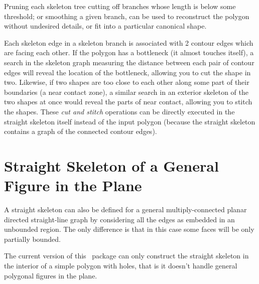 Pruning each skeleton tree cutting off branches whose length is below some threshold; or smoothing a given branch, can be used to reconstruct the polygon without undesired details, or fit into a particular canonical shape.

Each skeleton edge in a skeleton branch is associated with 2 contour edges which are facing each other. If the polygon has a bottleneck (it almost touches itself), a search in the skeleton graph measuring the distance between each pair of contour edges will reveal the location of the bottleneck, allowing you to cut the shape in two. Likewise, if two shapes are too close to each other along some part of their boundaries (a near contact zone), a similar search in an exterior skeleton of the two shapes at once would reveal the parts of near contact, allowing you to stitch the shapes. These \textit{cut and stitch} operations can be directly executed in the straight skeleton itself instead of the input polygon (because the straight skeleton contains a graph of the connected contour edges).


\section{Straight Skeleton of a General Figure in the Plane}

A straight skeleton can also be defined for a general
multiply-connected planar directed straight-line graph \cite{aa-skfgpf-95} by considering
all the edges as embedded in an unbounded region. The only difference
is that in this case some faces will be only partially bounded.


The current version of this \cgal\ package can only construct the
straight skeleton in the interior of a simple polygon with holes, that is it
doesn't handle general polygonal figures in the plane.


